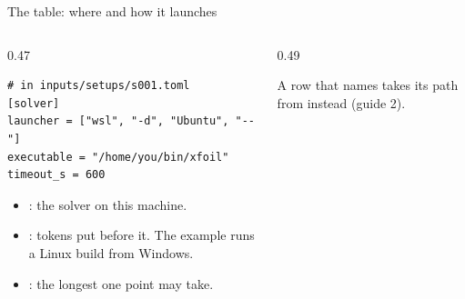 \begin{frame}[fragile]{The \code{[solver]} table: where and how it launches}
\begin{columns}[T]
\begin{column}{0.47\textwidth}
\begin{lstlisting}[style=cfdbtoml]
# in inputs/setups/s001.toml
[solver]
launcher = ["wsl", "-d", "Ubuntu", "--"]
executable = "/home/you/bin/xfoil"
timeout_s = 600
\end{lstlisting}
\begin{itemize}\small
  \item {}: the solver on this machine.
  \item {}: tokens put before it. The example runs a Linux
        build from Windows.
  \item {}: the longest one point may take.
\end{itemize}
\end{column}
\begin{column}{0.49\textwidth}
\par
\vspace{2mm}
{\small A row that names  takes its path from
 instead (guide 2).\par}
\end{column}
\end{columns}
\end{frame}
